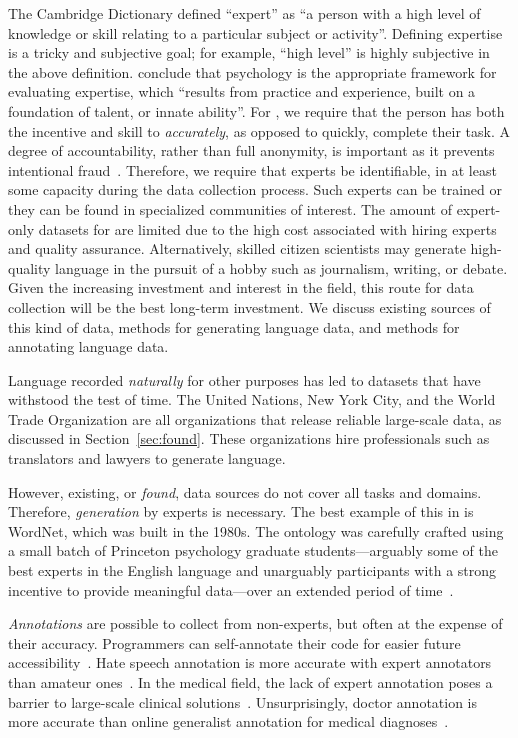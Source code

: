 The Cambridge Dictionary defined ``expert'' as ``a person with a high level of knowledge or skill relating to a particular subject or activity''.  
%
Defining expertise is a tricky and subjective goal; for example, ``high level'' is highly subjective in the above definition.   
%
\citet{Bourne2014ExpertiseDD} conclude that psychology is the appropriate framework for evaluating expertise, which ``results from practice and experience, built on a foundation of talent, or innate ability''.  
%
For \nlp{}, we require that the person has both the incentive and skill to \textit{accurately}, as opposed to quickly, complete their task.  
%
A degree of accountability, rather than full anonymity, is important as it prevents intentional fraud~\citep{teitcher2015detecting}.  
%
Therefore, we require that experts be identifiable, in at least some capacity during the data collection process.  
%
Such experts can be trained or they can be found in specialized communities of interest.  
%
The amount of expert-only datasets for \nlp{} are limited due to the high cost associated with hiring experts and quality assurance.  
%
Alternatively, skilled citizen scientists may generate high-quality language in the pursuit of a hobby such as journalism, writing, or debate.  
%
Given the increasing investment and interest in the field, this route for data collection will be the best long-term investment.  
%
We discuss existing sources of this kind of data, methods for generating language data, and methods for annotating language data.  

Language recorded \textit{naturally} for other purposes has led to datasets that have withstood the test of time.  
%
The United Nations, New York City, and the World Trade Organization are all organizations that release reliable large-scale data, as discussed in Section~\ref{sec:found}.  
%
These organizations hire professionals such as translators and lawyers to generate language.  

However, existing, or \textit{found}, data sources do not cover all \nlp{} tasks and domains.
%
Therefore, \textit{generation} by experts is necessary.  
%
The best example of this in \nlp{} is WordNet, which was built in the 1980s.
 The ontology was carefully crafted using a small batch of Princeton psychology graduate students---arguably some of the best experts in the English language and unarguably participants with a strong incentive to provide meaningful data---over an extended period of time~\citep{Miller95wordnet}.

\textit{Annotations} are possible to collect from non-experts, but often at the expense of their accuracy.
%
Programmers can self-annotate their code for easier future accessibility~\citep{shira2010expert}.
%
Hate speech annotation is more accurate with expert annotators than amateur ones~\citep{Waseem2016AreYA}.
%
In the medical field, the lack of expert annotation poses a barrier to large-scale \nlp{} clinical solutions~\citep{chapman2011overcoming}.
%
Unsurprisingly, doctor annotation is more accurate than online generalist annotation for medical diagnoses~\citep{cheng2015there}.  



